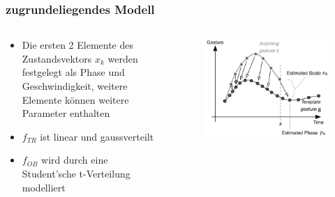 \documentclass{beamer}
\begin{document}
\begin{frame}\frametitle{zugrundeliegendes Modell}
\begin{columns}
\begin{column}{0.4\textwidth}
\begin{itemize}
\item Die ersten 2 Elemente des Zustandsvektors $x_k$ werden festgelegt als Phase und Geschwindigkeit, weitere Elemente können weitere Parameter enthalten
\item $f_{TR}$ ist linear und gaussverteilt
\item $f_{OB}$ wird durch eine Student'sche t-Verteilung modelliert
\end{itemize}
\end{column}
\begin{column}{0.6\textwidth}
\begin{figure}
\centering
\includegraphics[width=\linewidth]{../Bilder/Fig2}
\label{fig:Fig2}
\end{figure}
\end{column}
\end{columns}
\end{frame}
\end{document}
